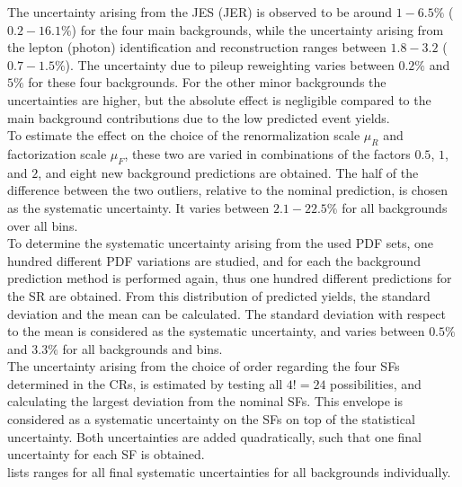 The uncertainty arising from the JES (JER) is observed to be around $1-6.5\%$ ($0.2-16.1\%$) for the four main backgrounds, while the uncertainty arising from the lepton (photon) identification and reconstruction ranges between $1.8-3.2$ ($0.7-1.5\%$). The uncertainty due to pileup reweighting varies between $0.2\%$ and $5\%$ for these four backgrounds. For the other minor backgrounds the uncertainties are higher, but the absolute effect is negligible compared to the main background contributions due to the low predicted event yields.\\
To estimate the effect on the choice of the renormalization scale $\mu_R$ and factorization scale $\mu_F$, these two are varied in combinations of the factors $0.5$, $1$, and $2$, and eight new background predictions are obtained. The half of the difference between the two outliers, relative to the nominal prediction, is chosen as the systematic uncertainty. It varies between $2.1-22.5\%$ for all backgrounds over all bins.\\
To determine the systematic uncertainty arising from the used PDF sets, one hundred different PDF variations are studied, and for each the background prediction method is performed again, thus one hundred different predictions for the SR are obtained. From this distribution of predicted yields, the standard deviation and the mean can be calculated. The standard deviation with respect to the mean is considered as the systematic uncertainty, and varies between $0.5\%$ and $3.3\%$ for all backgrounds and bins.\\
The uncertainty arising from the choice of order regarding the four SFs determined in the CRs, is estimated by testing all $4!=24$ possibilities, and calculating the largest deviation from the nominal SFs. This envelope is considered as a systematic uncertainty on the SFs on top of the statistical uncertainty. Both uncertainties are added quadratically, such that one final uncertainty for each SF is obtained.\\
 lists ranges for all final systematic uncertainties for all backgrounds individually.
